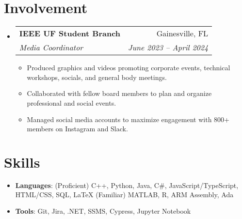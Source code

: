 \documentclass[letterpaper,11pt]{article}
\makeatletter
\newcommand{\resumeItemSkills}[2]{
  \item\normalsize{
    \textbf{#1}{: #2 \vspace{-2pt}}
  }
}
\newcommand{\resumeItemExperience}[1]{
  \item\small{
    {#1 \vspace{-2pt}}
  }
}
\newcommand{\resumeSubheading}[4]{
  \vspace{-1pt}\item
    \begin{tabular*}{0.97\textwidth}{l@{\extracolsep{\fill}}r}
      \textbf{#1} & #2 \\
      \textit{\small#3} & \textit{\small #4} \\
    \end{tabular*}\vspace{-6pt}
}
\newcommand{\resumeSubItemSkills}[2]{\resumeItemSkills{#1}{#2}\vspace{-4pt}}
\newcommand{\resumeSubHeadingListStart}{\begin{itemize}[leftmargin=*, label={}]}
\newcommand{\resumeSubHeadingListStartSkillsAwards}{\begin{itemize}[leftmargin=*]}
\newcommand{\resumeSubHeadingListEnd}{\end{itemize}}
\newcommand{\resumeItemListStart}{\begin{itemize}}
\newcommand{\resumeItemListEnd}{\end{itemize}\vspace{-5pt}}
\makeatother
\begin{document}
\section{Involvement}
    \resumeSubHeadingListStart
      \resumeSubheading
        {IEEE UF Student Branch}{Gainesville, FL}
        {Media Coordinator}{June 2023 -- April 2024}
        \resumeItemListStart
          \resumeItemExperience
            {Produced graphics and videos promoting corporate events, technical workshops, socials, and general body meetings.}
          \resumeItemExperience
            {Collaborated with fellow board members to plan and organize professional and social events.}
          \resumeItemExperience
            {Managed social media accounts to maximize engagement with 800+ members on Instagram and Slack.}
        \resumeItemListEnd
    \resumeSubHeadingListEnd
          
\section{Skills}
  \resumeSubHeadingListStartSkillsAwards
    \resumeSubItemSkills{Languages}{(Proficient) C++, Python, Java, C\#, JavaScript/TypeScript, HTML/CSS, SQL, LaTeX \newline
    (Familiar) MATLAB, R, ARM Assembly, Ada}
    \resumeSubItemSkills{Tools}{Git, Jira, .NET, SSMS, Cypress, Jupyter Notebook}
  \resumeSubHeadingListEnd
\end{document}
